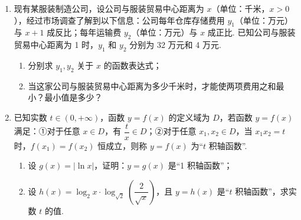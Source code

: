 \documentclass[a4paper,11pt]{article}
\begin{document}
\begin{enumerate}
\ansspace[6]

\item 现有某服装制造公司，设公司与服装贸易中心距离为 $x$（单位：千米，$x>0$），经过市场调查了解到以下信息：公司每年仓库存储费用 $y_1$（单位：万元）与 $x+1$ 成反比；每年运输费 $y_2$（单位：万元）与 $x$ 成正比. 已知公司与服装贸易中心距离为 1 时，$y_1$ 和 $y_2$ 分别为 32 万元和 4 万元.

\begin{enumerate}[label=(\arabic*)]
\item 分别求 $y_1,y_2$ 关于 $x$ 的函数表达式；
\item 当这家公司与服装贸易中心距离为多少千米时，才能使两项费用之和最小？最小值是多少？
\end{enumerate}

\ifanswer
\solbegin
{}
\solend
\fi

\ansspace[8]

\item 已知实数 $t\in(0,+\infty)$，函数 $y=f(x)$ 的定义域为 $D$，若函数 $y=f(x)$ 满足：①对于任意 $x\in D$，有 $\dfrac tx\in D$；②对于任意 $x_1,x_2\in D$，当 $x_1x_2=t$ 时，$f(x_1)=f(x_2)$ 恒成立，则称 $y=f(x)$ 为“$t$ 积轴函数”.

\begin{enumerate}[label=(\arabic*)]
\item 设 $g(x)=|\ln x|$，证明：$y=g(x)$ 是“1 积轴函数”；
\item 设 $h(x)=\log_2x\cdot\log_{\sqrt2}\left(\dfrac{2}{\sqrt x}\right)$，且 $y=h(x)$ 是“$t$ 积轴函数”，求实数 $t$ 的值.
\end{enumerate}


\end{enumerate}
\end{document}
